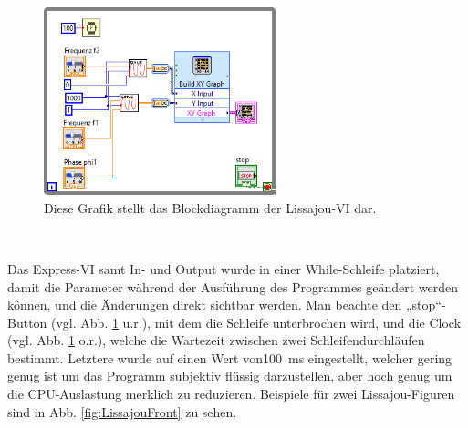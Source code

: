 \

\begin{figure}[H]
	\centering
	\includegraphics[width=0.6\textwidth]{pic/LisBlock.png}
	\caption{Diese Grafik stellt das Blockdiagramm der Lissajou-VI dar.}
	\label{fig:LissajouBlock}	
\end{figure} 

\

Das Express-VI samt In- und Output wurde in einer While-Schleife platziert, damit die Parameter während der Ausführung des Programmes geändert werden können, und die Änderungen direkt sichtbar werden. Man beachte den „stop“-Button (vgl. Abb. \ref{fig:LissajouBlock} u.r.), mit dem die Schleife unterbrochen wird, und die Clock (vgl. Abb. \ref{fig:LissajouBlock} o.r.), welche die Wartezeit zwischen zwei Schleifendurchläufen bestimmt. Letztere wurde auf einen Wert von\SI{100}{\milli\second} eingestellt, welcher gering genug ist um das Programm subjektiv flüssig darzustellen, aber hoch genug um die CPU-Auslastung merklich zu reduzieren.
Beispiele für zwei Lissajou-Figuren sind in Abb. \ref{fig:LissajouFront} zu sehen.
\

